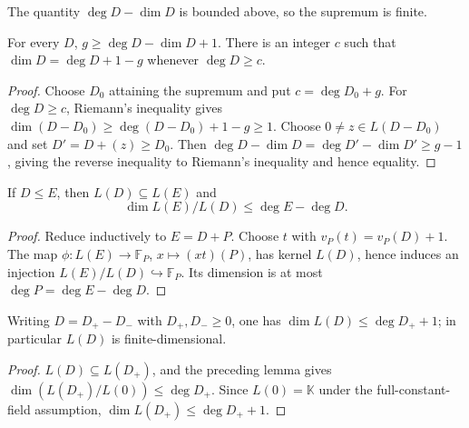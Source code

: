 \begin{remark}
\label{par-rem-genus-supremum}
\uses{}
The quantity $\deg D-\dim D$ is bounded above, so the supremum is finite.
\end{remark}

\begin{lemma}
\label{par-lem-riemann-inequality}
\uses{}
For every $D$, $g\geq\deg D-\dim D+1$. There is an integer $c$ such that
$\dim D=\deg D+1-g$ whenever $\deg D\geq c$.
\end{lemma}
\begin{proof}
Choose $D_0$ attaining the supremum and put $c=\deg D_0+g$. For
$\deg D\geq c$, Riemann's inequality gives
$\dim(D-D_0)\geq\deg(D-D_0)+1-g\geq1$. Choose
$0\neq z\in L(D-D_0)$ and set $D'=D+(z)\geq D_0$. Then
$\deg D-\dim D=\deg D'-\dim D'\geq g-1$, giving the reverse inequality to
Riemann's inequality and hence equality.
\end{proof}

\begin{lemma}
\label{par-lem-L-inclusion-bound}
\uses{}
If $D\leq E$, then $L(D)\subseteq L(E)$ and
\[
\dim L(E)/L(D)\leq\deg E-\deg D.
\]
\end{lemma}
\begin{proof}
Reduce inductively to $E=D+P$. Choose $t$ with
$v_P(t)=v_P(D)+1$. The map
$\phi:L(E)\to\mathbb F_P$, $x\mapsto(xt)(P)$, has kernel $L(D)$, hence induces
an injection $L(E)/L(D)\hookrightarrow\mathbb F_P$. Its dimension is at most
$\deg P=\deg E-\deg D$.
\end{proof}

\begin{lemma}
\label{par-lem-L-finite}
\uses{}
Writing $D=D_+-D_-$ with $D_+,D_-\geq0$, one has
$\dim L(D)\leq\deg D_++1$; in particular $L(D)$ is finite-dimensional.
\end{lemma}
\begin{proof}
$L(D)\subseteq L(D_+)$, and the preceding lemma gives
$\dim(L(D_+)/L(0))\leq\deg D_+$. Since $L(0)=\mathbb K$ under the full-constant-
field assumption, $\dim L(D_+)\leq\deg D_++1$.
\end{proof}

